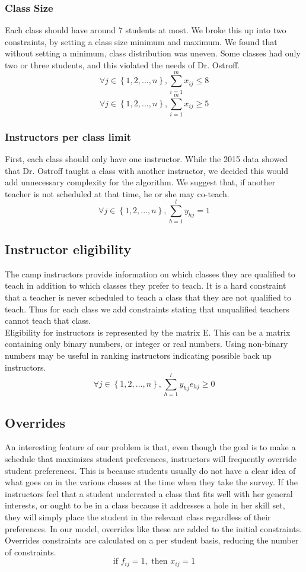 \documentclass[11pt]{article}
\begin{document}
\subsubsection{Class Size}
Each class should have around 7 students at most. We broke this up into two constraints, by setting a class size minimum and maximum. We found that without setting a minimum, class distribution was uneven. Some classes had only two or three students, and this violated the needs of Dr. Ostroff.
\[\forall j \in \left\{ {1,2,...,n}\right\},\sum_{i=1}^{m}x_{ij} \leq 8\]
\[\forall j \in \left\{ {1,2,...,n}\right\},\sum_{i=1}^{m}x_{ij} \geq 5\]
\subsubsection{Instructors per class limit}
First, each class should only have one instructor. While the 2015 data showed that Dr. Ostroff taught a class with another instructor, we decided this would add unnecessary complexity for the algorithm. We suggest that, if another teacher is not scheduled at that time, he or she may co-teach.
\[\forall j \in \left\{ {1,2,...,n}\right\}, \sum_{h=1}^{l}y_{hj} = 1\]
\subsection{Instructor eligibility}
The camp instructors provide information on which classes they are qualified to teach in addition to which classes they prefer to teach. It is a hard constraint that a teacher is never scheduled to teach a class that they are not qualified to teach. Thus for each class we add constraints stating that unqualified teachers cannot teach that class.\\
\indent Eligibility for instructors is represented by the matrix E. This can be a matrix containing only binary numbers, or integer or real numbers. Using non-binary numbers may be useful in ranking instructors indicating possible back up instructors.
\[\forall j \in \left\{ {1,2,...,n}\right\}, \sum_{h=1}^{l}y_{hj}e_{hj} \geq 0\]

	\subsection{Overrides}
An interesting feature of our problem is that, even though the goal is to make a schedule that maximizes student preferences, instructors will frequently override student preferences. This is because students usually do not have a clear idea of what goes on in the various classes at the time when they take the survey. If the instructors feel that a student underrated a class that fits well with her general interests, or ought to be in a class because it addresses a hole in her skill set, they will simply place the student in the relevant class regardless of their preferences. In our model, overrides like these are added to the initial constraints.\\
\indent Overrides constraints are calculated on a per student basis, reducing the number of constraints.
\[ \text{if } f_{ij} = 1, \text{ then } x_{ij} = 1\]
\end{document}
